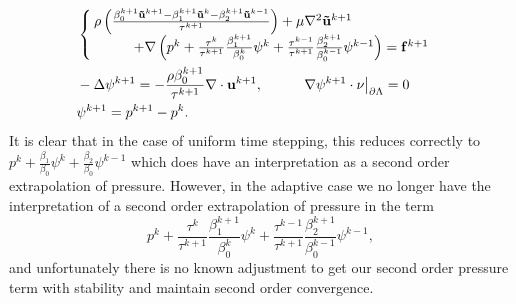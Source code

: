 \documentclass[letterpaper]{erdc}
\begin{document}
\begin{align}
  &\begin{cases}\rho\left(\frac{\beta_0^{k+1}\mathbf{\tilde{u}}^{k+1} - \beta_1^{k+1}\mathbf{\tilde{u}}^{k} - \beta_2^{k+1}\mathbf{\tilde{u}}^{k-1}}{\tau^{k+1}} \right) + \mu\nabla^2 \mathbf{\tilde{u}}^{k+1} \\
    \hspace{1cm}+ \nabla\left( p^{k} + \frac{\tau^{k}}{\tau^{k+1}}\frac{\beta_1^{k+1}}{\beta_0^{k}}\psi^{k} + \frac{\tau^{k-1}}{\tau^{k+1}}\frac{\beta_2^{k+1}}{\beta_0^{k-1}}\psi^{k-1} \right) = \mathbf{f}^{k+1} \end{cases}\label{eq:newadaptivevelocitybdf2}\\
  &-\Delta \psi^{k+1} = -\frac{\rho\beta_0^{k+1}}{\tau^{k+1}}\nabla\cdot\textbf{u}^{k+1}, \hspace{1cm} \left.\nabla\psi^{k+1}\cdot\nu\right|_{\partial\Lambda} = 0 \label{eq:newadaptivepressurecorrectionbdf2}\\
  & \psi^{k+1} = p^{k+1} - p^{k}.
\end{align}
It is clear that in the case of uniform time stepping, this reduces correctly to $p^{k} + \frac{\beta_1}{\beta_0}\psi^k + \frac{\beta_2}{\beta_0}\psi^{k-1}$ which does have an interpretation as a second order extrapolation of pressure.   However, in the adaptive case we no longer have the interpretation of a second order extrapolation of pressure in the term
\begin{equation}
  p^{k} + \frac{\tau^{k}}{\tau^{k+1}}\frac{\beta_1^{k+1}}{\beta_0^{k}}\psi^{k} + \frac{\tau^{k-1}}{\tau^{k+1}}\frac{\beta_2^{k+1}}{\beta_0^{k-1}}\psi^{k-1},
\end{equation}
and unfortunately there is no known adjustment to get our second order pressure term with stability and maintain second order convergence.
\end{document}
